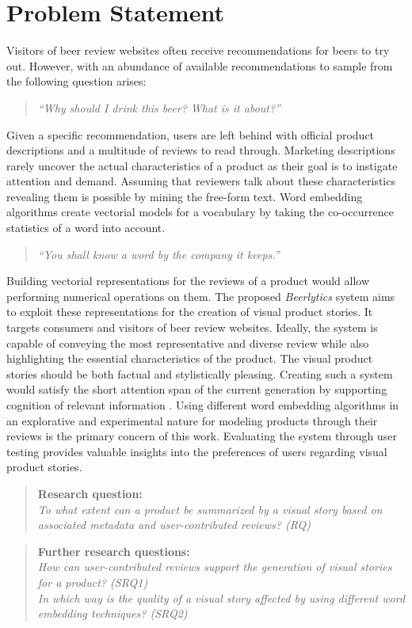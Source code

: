 \section{Problem Statement} \label{sec:problem-statement}
Visitors of beer review websites often receive recommendations for beers to try out.
However, with an abundance of available recommendations to sample from the following question arises:
\begin{quote}
    \emph{``Why should I drink this beer? What is it about?''}
\end{quote}
Given a specific recommendation, users are left behind with official product descriptions and a multitude of reviews to read through.
Marketing descriptions rarely uncover the actual characteristics of a product as their goal is to instigate attention and demand.
Assuming that reviewers talk about these characteristics revealing them is possible by mining the free-form text.
Word embedding algorithms create vectorial models for a vocabulary by taking the co-occurrence statistics of a word into account.
\begin{quote}
	\emph{``You shall know a word by the company it keeps.''} \cite{Firth1957}
\end{quote}
Building vectorial representations for the reviews of a product would allow performing numerical operations on them.
The proposed \textit{Beerlytics} system aims to exploit these representations for the creation of visual product stories.
It targets consumers and visitors of beer review websites.
Ideally, the system is capable of conveying the most representative and diverse review while also highlighting the essential characteristics of the product.
The visual product stories should be both factual and stylistically pleasing.
Creating such a system would satisfy the short attention span of the current generation by supporting cognition of relevant information \cite{MicrosoftCanada2015}.
Using different word embedding algorithms in an explorative and experimental nature for modeling products through their reviews is the primary concern of this work.
Evaluating the system through user testing provides valuable insights into the preferences of users regarding visual product stories.

\begin{quote}
    \textbf{Research question:}\\
    \emph{To what extent can a product be summarized by a visual story based on associated metadata and user-contributed reviews? (RQ)}
\end{quote}

\begin{quote}
    \textbf{Further research questions:}\\
    \emph{How can user-contributed reviews support the generation of visual stories for a product? (SRQ1)}\\
    \emph{In which way is the quality of a visual story affected by using different word embedding techniques? (SRQ2)}
\end{quote}